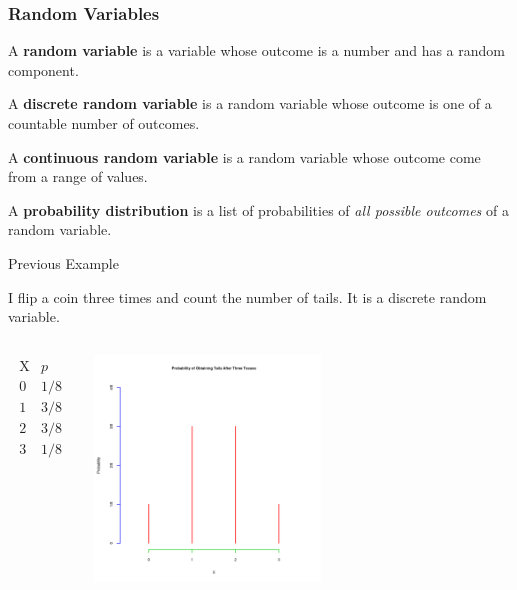 \begin{frame}
  \frametitle{Random Variables}

  \begin{definition}
    A \textbf{random variable} is a variable whose outcome is a number
    and has a random component.
  \end{definition}

  {
    \begin{definition}
      A \textbf{discrete random variable} is a random variable whose
      outcome is one of a countable number of outcomes.
    \end{definition}
  }

  {
    \begin{definition}
      A \textbf{continuous random variable} is a random variable whose
      outcome come from a range of values.
    \end{definition}
  }

  {
    \begin{definition}
      A \textbf{probability distribution} is a list of probabilities of
      \textit{all possible outcomes} of a random variable.
    \end{definition}
  }

\end{frame}

\begin{frame}{Previous Example}

  I flip a coin three times and count the number of tails. It is a
  discrete random variable.

  \begin{columns}

    \begin{eqnarray*}
      \begin{array}{l|l}
        \mathrm{X} & p \\ \hline
        0  & 1/8 \\
        1  & 3/8 \\
        2  & 3/8 \\
        3  & 1/8
      \end{array}
    \end{eqnarray*}


    \includegraphics[width=6cm]{img/probDist3Tosses}

  \end{columns}
  
  
\end{frame}


